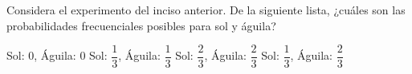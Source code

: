 Considera el experimento del inciso anterior. De la siguiente lista,
¿cuáles son las probabilidades frecuenciales posibles para sol y águila?

\begin{choices}
    \choice Sol: 0, Águila: 0
    \choice Sol: $\dfrac{1}{3}$, Águila: $\dfrac{1}{3}$
    \choice Sol: $\dfrac{2}{3}$, Águila: $\dfrac{2}{3}$
    \CorrectChoice Sol: $\dfrac{1}{3}$, Águila: $\dfrac{2}{3}$
\end{choices}